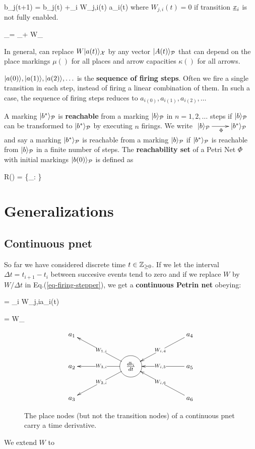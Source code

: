 \beq
b_j(t+1) = b_j(t)
+\sum_i W_{j,i}(t) a_i(t)
\eeq
where $W_{j,i}(t)=0$ if 
transition $\rvx_i$ 
is not fully enabled.
 
\beq
{}_\calp =
_\calp +
W_\calx
\label{eq-firing-stepper}
\eeq
 
 In general, can replace $W|a(t)\rangle_{\cal X}$ by
 any vector 
 $|A(t)\rangle_{\cal P}$ that can depend on
 the place markings $\mu()$
 for all places
 and
 arrow capacities
 $\kappa()$
 for
 all arrows.

$|a(0)\rangle, |a(1)\rangle, |a(2)\rangle,
\ldots$ is the {\bf sequence of firing
steps}.
Often we fire a single transition
in each step,
instead of firing a linear combination 
of them. In such a case, the
sequence of firing steps reduces to
$a_{i(0)}, a_{i(1)}, a_{i(2)},
\ldots$


A marking $|b^*\rangle_{\cal P}$ is {\bf reachable} from a marking  $|b\rangle_{\cal P}$ in 
$n = 1, 2, \ldots$  steps if
$|b\rangle_{\cal P}$ can be transformed to $|b^*\rangle_{\cal P}$ by executing $n$ firings. We write 
$\xymatrix{\ket{b}_\calp\ar[r]_\Phi& \ket{b^*}_\calp}$ and say a
marking $|b^*\rangle_{\cal P}$ is reachable from a marking
$|b\rangle_{\cal P}$ if $|b^*\rangle_{\cal P}$ is reachable from 
$|b\rangle_{\cal P}$ in a finite
number of steps.
The {\bf reachability set} of a Petri Net $\Phi$ with 
initial markings $|b(0)\rangle_{\cal P}$ is defined as

\beq
R(\Phi) = \{_\calp: 
 \}
\eeq



\section{Generalizations}
\subsection{Continuous pnet}
So far we have considered
discrete time $t\in {\mathbb{Z}}_{\geq 0}$.
If we let the interval $\Delta t=t_{i+1}-t_i$ between
succesive events tend to zero
and if we replace $W$ by 
$W/\Delta t$ in Eq.(\ref{eq-firing-stepper}), we get
a {\bf continuous Petrin net} obeying:

\beq
{}=
\sum_i W_{j,i}a_i(t)
\eeq


\beq
{}=
W_\calx
\label{eq-diff-eq-W}
\eeq


\begin{figure}[h!]
$$
\xymatrix@C=5pc{
{a_1}
&&{a_4}
\ar[dl]|{W_{i,4}}
\\
{a_2}
&
*+++[o][F-]{\frac{db_i}{dt}}
\ar[lu]|{W_{1, i}}
\ar[ld]|{W_{2,i}}
\ar[l]|{W_{3, i}}
& {a_5}
\ar[l]|{W_{i,5}}
\\
{a_3}
&&
{a_6}
\ar[lu]|{W_{i,6}}
}$$
\caption{The place nodes (but not the transition nodes)
of a continuous pnet carry a time derivative.}
\label{eq-continuous-pn}
\end{figure}
We extend $W$ to

